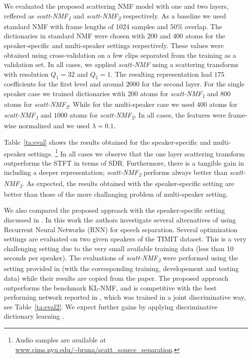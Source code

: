  We evaluated the proposed scattering NMF model with one and two layers, reffered
as \emph{scatt-NMF\textsubscript{1}} and \emph{scatt-NMF\textsubscript{2}} respectively. As a baseline we used standard NMF 
with frame lengths of 1024 samples and 50\% overlap. 
%
The dictionaries in standard NMF were chosen with $200$ and $400$ atoms for the speaker-specific and multi-speaker
settings respectively. These values were obtained using cross-validation on a few clips separated from the training as a validation set.
%
In all cases, we applied \emph{scatt-NMF} using a scattering transforms with resolution $Q_1= 32$ and $Q_2=1$.
The resulting representation had $175$ coefficients for the first level and around $2000$ for the second layer. 
%
For the single speaker case we trained dictionaries with $200$ atoms for \emph{scatt-NMF\textsubscript{1}}  and $800$ atoms for \emph{scatt-NMF\textsubscript{2}}.
While for the multi-speaker case we used $400$ atoms for \emph{scatt-NMF\textsubscript{1}}  and $1000$ atoms for \emph{scatt-NMF\textsubscript{2}}.
In all cases, the features were frame-wise normalized and we used $\lambda=0.1$. 
%
%

 Table~\ref{ta:eval} shows the results obtained for the speaker-specific and multi-speaker settings. \footnote{Audio samples are available at \url{www.cims.nyu.edu/~bruna/scatt_source_separation}.}
In all cases we observe that the one layer scattering transform outperforms the STFT in terms of SDR.
Furthermore, there is a tangible gain in including a deeper representation; \emph{scatt-NMF\textsubscript{2}} 
performs always better than \emph{scatt-NMF\textsubscript{1}}. 
As expected, the results obtained with the speaker-specific setting are better than those of the more challanging problem
of multi-speaker setting. 

We also compared the proposed approach with the speaker-specific setting discussed in \cite{Huang_DNN_Separation_ICASSP2014}. In this work
the authors investigate several alternatives of using Recurrent Neural Networks (RNN) for speech separation.
Several optimization settings are evaluated on two given speakers of the TIMIT dataset. This is a very challenging setting
due to the very small available training data (less than 10 seconds per speaker). The evaluations of \emph{scatt-NMF\textsubscript{2}} were performed using the setting provided in \cite{Huang_DNN_Separation_ICASSP2014} (with the corresponding training, developement and testing data) while their results are copied from the paper.
The proposed approach outperforms the benchmark KL-NMF, and is competitive 
with the best performing network
reported in \cite{Huang_DNN_Separation_ICASSP2014}, which was trained in a joint discriminative way, see Table~\ref{ta:eval2}.
We expect further gains by applying discriminative dictionary learning \cite{sprechmann2014supervised}.

